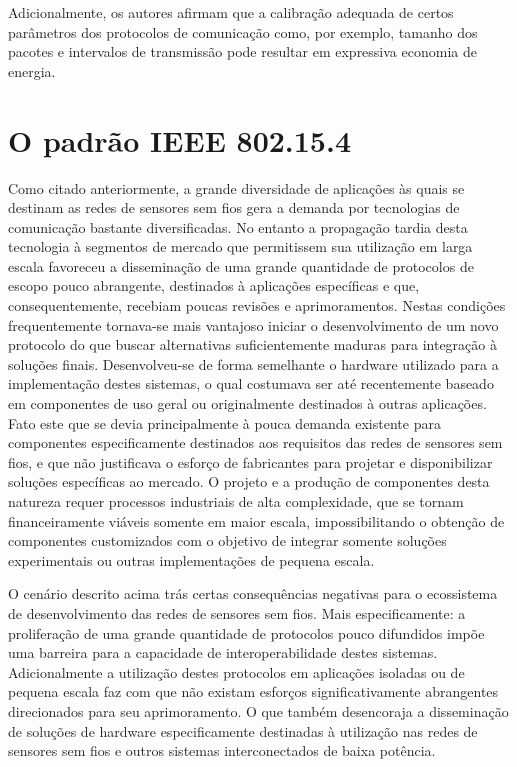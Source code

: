 \documentclass[
	12pt,				%
	openright,			%
	oneside,
	a4paper,			%
	english,			%
	french,				%
	spanish,			%
	brazil				%
	]{abntex2}
\begin{document}
Adicionalmente, os autores afirmam que a calibração adequada de certos parâmetros dos protocolos de comunicação como, por exemplo, tamanho dos pacotes e intervalos de transmissão pode resultar em expressiva economia de energia.

\chapter{O padrão IEEE 802.15.4}

Como citado anteriormente, a grande diversidade de aplicações às quais se destinam as redes de sensores sem fios gera a demanda por tecnologias de comunicação bastante diversificadas. No entanto a propagação tardia desta tecnologia à segmentos de mercado que permitissem sua utilização em larga escala favoreceu a disseminação de uma grande quantidade de protocolos de escopo pouco abrangente, destinados à aplicações específicas e que, consequentemente, recebiam poucas revisões e aprimoramentos. Nestas condições frequentemente tornava-se mais vantajoso iniciar o desenvolvimento de um novo protocolo do que buscar alternativas suficientemente maduras para integração à soluções finais. Desenvolveu-se de forma semelhante o hardware utilizado para a implementação destes sistemas, o qual costumava ser até recentemente baseado em componentes de uso geral ou originalmente destinados à outras aplicações. Fato este que se devia principalmente à pouca demanda existente para componentes especificamente destinados aos requisitos das redes de sensores sem fios, e que não justificava o esforço de fabricantes para projetar e disponibilizar soluções específicas ao mercado. O projeto e a produção de componentes desta natureza requer processos industriais de alta complexidade, que se tornam financeiramente viáveis somente em maior escala, impossibilitando o obtenção de componentes customizados com o objetivo de integrar somente soluções experimentais ou outras implementações de pequena escala.

O cenário descrito acima trás certas consequências negativas para o ecossistema de desenvolvimento das redes de sensores sem fios. Mais especificamente: a proliferação de uma grande quantidade de protocolos pouco difundidos impõe uma barreira para a capacidade de interoperabilidade destes sistemas. Adicionalmente a utilização destes protocolos em aplicações isoladas ou de pequena escala faz com que não existam esforços significativamente abrangentes direcionados para seu aprimoramento. O que também desencoraja a disseminação de soluções de hardware especificamente destinadas à utilização nas redes de sensores sem fios e outros sistemas interconectados de baixa potência.
\end{document}
